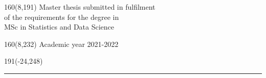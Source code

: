 %
\begin{textblock}{160}(8,191)
\textblockcolour{}
\vspace{-\parskip}
\flushright
Master thesis submitted in fulfilment  \\[4.5pt]
 of the requirements for the degree in \\[4.5pt]
MSc in Statistics and Data Science\\[4.5pt]
\end{textblock}
%
\begin{textblock}{160}(8,232)
\textblockcolour{}
\vspace{-\parskip}
\flushright
Academic year 2021-2022
\end{textblock}
%
\begin{textblock}{191}(-24,248)
{\color{blueline}\rule{550pt}{5.5pt}}
\end{textblock}
%
\vfill
